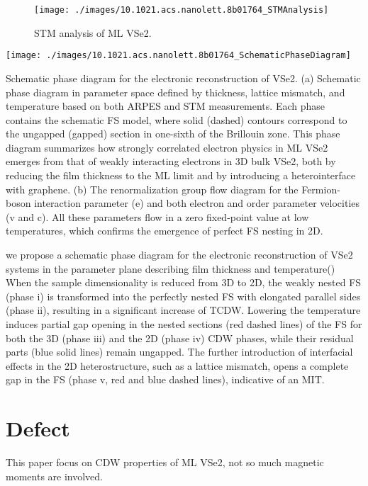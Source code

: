 \begin{figure}[ht] 
    \texttt{[image: ./images/10.1021.acs.nanolett.8b01764\_STMAnalysis]}
	\caption[STM analysis of ML VSe2]{
		STM analysis of ML VSe2.
	}
\end{figure}

\begin{marginfigure}
    \texttt{[image: ./images/10.1021.acs.nanolett.8b01764\_SchematicPhaseDiagram]}
	\caption[Schematic phase diagram for the electronic reconstruction of VSe2]{
        Schematic phase diagram for the electronic reconstruction of VSe2. (a) Schematic phase diagram in parameter space defined by thickness, lattice mismatch, and temperature based on both ARPES and STM measurements. Each phase contains the schematic FS model, where solid (dashed) contours correspond to the ungapped (gapped) section in one-sixth of the Brillouin zone. This phase diagram summarizes how strongly correlated electron physics in ML VSe2 emerges from that of weakly interacting electrons in 3D bulk VSe2, both by reducing the film thickness to the ML limit and by introducing a heterointerface with graphene. (b) The renormalization group flow diagram for the Fermion-boson interaction parameter (e) and both electron and order parameter velocities (v and c). All these parameters flow in a zero fixed-point value at low temperatures, which confirms the emergence of perfect FS nesting in 2D.
    	}
\end{marginfigure}

we propose a schematic phase diagram for the electronic reconstruction of VSe2 systems in the parameter plane describing film thickness and temperature() When the sample dimensionality is reduced from 3D to 2D, the weakly nested FS (phase i) is transformed into the perfectly nested FS with elongated parallel sides (phase ii), resulting in a significant increase of TCDW. Lowering the temperature induces partial gap opening in the nested sections (red dashed lines) of the FS for both the 3D (phase iii) and the 2D (phase iv) CDW phases, while their residual parts (blue solid lines) remain ungapped. The further introduction of interfacial effects in the 2D heterostructure, such as a lattice mismatch, opens a complete gap in the FS (phase v, red and blue dashed lines), indicative of an MIT.

\section{Defect}
This paper focus on CDW properties of ML VSe2, not so much magnetic moments are involved.

